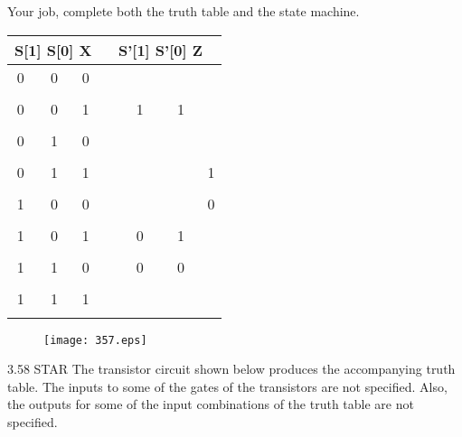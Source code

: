 \documentclass{patt}
\begin{document}
\begin{exercises}
Your job, complete both the truth table and the state machine.

\begin{center}
\begin{tabular}{c|c}
    S[1] S[0] X & S'[1] S'[0] Z \\
    \hline
    0 \ \ \ 0 \ \ \hspace{0.02in} 0 & \\ \\
    0 \ \ \ 0 \ \ \hspace{0.02in} 1 & \hspace{-0.25in} 1 \ \ \ \ 1 \\ \\
    0 \ \ \ 1 \ \ \hspace{0.02in} 0 & \\ \\
    0 \ \ \ 1 \ \ \hspace{0.02in} 1 & \ \ \ \ \ \ \ \ \ \ \ \ \ \ 1\\ \\
    1 \ \ \ 0 \ \ \hspace{0.02in} 0 & \ \ \ \ \ \ \ \ \ \ \ \ \ \ 0\\ \\
    1 \ \ \ 0 \ \ \hspace{0.02in} 1 & \hspace{-0.25in} 0 \ \ \ \ 1 \\ \\
    1 \ \ \ 1 \ \ \hspace{0.02in} 0 & \hspace{-0.25in} 0 \ \ \ \ 0 \\ \\
    1 \ \ \ 1 \ \ \hspace{0.02in} 1 & \\ \\
\end{tabular}
\end{center}

\begin{figure}[h]
\centering
\texttt{[image: 357.eps]}
\end{figure}


\newpage

\item[3.58]STAR The transistor circuit shown below produces the accompanying truth table.  The inputs to some of the gates of the transistors are not specified. Also, the outputs for some of the input combinations of the truth table are not specified.
\\


\end{exercises}
\end{document}

